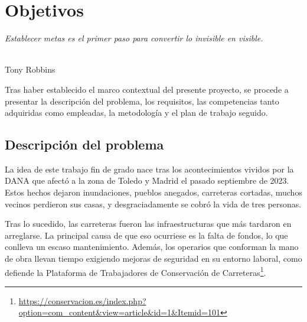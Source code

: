 \chapter{Objetivos}
\label{cap:capitulo3}

\begin{flushright}
\begin{minipage}[]{10cm}
\emph{Establecer metas es el primer paso para convertir lo invisible en visible.}\\
\end{minipage}\\

Tony Robbins\\
\end{flushright}

\vspace{1cm}
\setcounter{footnote}{25} 

Tras haber establecido el marco contextual del presente proyecto, se procede a presentar la descripción del problema, los requisitos, las competencias tanto adquiridas como empleadas, la metodología y el plan de trabajo seguido.

\section{Descripción del problema}
\label{sec:descripcion}

La idea de este trabajo fin de grado nace tras los acontecimientos vividos por la \ac{DANA} que afectó a la zona de Toledo y Madrid el pasado septiembre de 2023. Estos hechos dejaron inundaciones, pueblos anegados, carreteras cortadas, muchos vecinos perdieron sus casas, y desgraciadamente se cobró la vida de tres personas. 

Tras lo sucedido, las carreteras fueron las infraestructuras que más tardaron en arreglarse. La principal causa de que eso ocurriese es la falta de fondos, lo que conlleva un escaso mantenimiento. Además, los operarios que conforman la mano de obra llevan tiempo exigiendo mejoras de seguridad en su entorno laboral, como defiende la Plataforma de Trabajadores de Conservación de Carreteras\footnote{\url{https://conservacion.es/index.php?option=com_content&view=article&id=1&Itemid=101}}.
   
